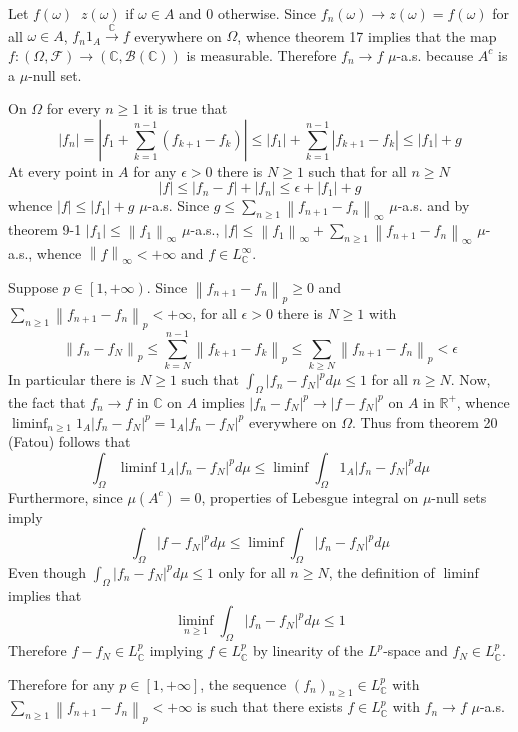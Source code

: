 \documentclass[a4paper]{article}
\newcommand{\clo}[1]{\left [ #1 \right ]}
\newcommand{\clop}[1]{\left [ #1 \right )}
\newcommand{\brac}[1]{\left ( #1 \right )}
\newcommand{\abs}[1]{\left | #1 \right |}
\newcommand{\nrm}[1]{\left\| #1 \right \|}
\newcommand{\Real}{\mathbb{R}}
\newcommand{\Cplx}{\mathbb{C}}
\newcommand{\Fcal}{\mathcal{F}}
\newcommand{\borel}[1]{\mathcal{B}\brac{#1}}
\newcommand{\defn}{\mathop{\overset{\Delta}{=}}\nolimits}
\begin{document}
Let $f\brac{\omega}\defn z\brac{\omega}$ if $\omega\in A$ and $0$ otherwise. Since $f_n\brac{\omega}\to z\brac{\omega} = f\brac{\omega}$ for all $\omega\in A$, $f_n 1_A \overset{\Cplx}{\to} f$ everywhere on $\Omega$, whence theorem 17 implies that the map $f:\brac{\Omega, \Fcal}\to\brac{\Cplx, \borel{\Cplx}}$ is measurable. Therefore $f_n\to f$ $\mu$-a.s. because $A^c$ is a $\mu$-null set.

On $\Omega$ for every $n\geq 1$ it is true that \[\abs{f_n} = \abs{f_1+\sum_{k=1}^{n-1}\brac{f_{k+1}-f_k}}\leq \abs{f_1} + \sum_{k=1}^{n-1} \abs{f_{k+1}-f_k} \leq \abs{f_1} + g\] At every point in $A$ for any $\epsilon>0$ there is $N\geq 1$ such that for all $n\geq N$ \[\abs{f} \leq \abs{f_n-f}+\abs{f_n} \leq \epsilon + \abs{f_1} + g\] whence $\abs{f}\leq \abs{f_1} + g$ $\mu$-a.s. Since $g\leq \sum_{n\geq 1} \nrm{f_{n+1}-f_n}_\infty$ $\mu$-a.s. and by theorem 9-1 $\abs{f_1}\leq \nrm{f_1}_\infty$ $\mu$-a.s., $\abs{f}\leq \nrm{f_1}_\infty + \sum_{n\geq 1} \nrm{f_{n+1}-f_n}_\infty$ $\mu$-a.s., whence $\nrm{f}_\infty < +\infty$ and $f\in L^\infty_\Cplx$.

Suppose $p\in \clop{1, +\infty}$. Since $\nrm{f_{n+1}-f_n}_p\geq 0$ and $\sum_{n\geq 1} \nrm{f_{n+1}-f_n}_p < +\infty$, for all $\epsilon>0$ there is $N\geq 1$ with \[\nrm{f_n - f_N}_p \leq \sum_{k=N}^{n-1} \nrm{f_{k+1}-f_k}_p\leq \sum_{k\geq N} \nrm{f_{n+1}-f_n}_p < \epsilon\] In particular there is $N\geq 1$ such that $\int_\Omega \abs{ f_n - f_N}^p d\mu \leq 1$ for all $n\geq N$. Now, the fact that $f_n\to f$ in $\Cplx$ on $A$ implies $\abs{f_n-f_N}^p \to \abs{f-f_N}^p$ on $A$ in $\Real^+$, whence $\liminf_{n\geq 1} 1_A\abs{f_n-f_N}^p = 1_A\abs{f_n-f_N}^p$ everywhere on $\Omega$. Thus from theorem 20 (Fatou) follows that \[\int_\Omega \liminf 1_A \abs{f_n-f_N}^p d\mu \leq \liminf \int_\Omega 1_A \abs{f_n-f_N}^p d\mu\] Furthermore, since $\mu\brac{A^c}=0$, properties of Lebesgue integral on $\mu$-null sets imply \[\int_\Omega \abs{f-f_N}^p d\mu \leq \liminf \int_\Omega \abs{f_n-f_N}^p d\mu\] Even though $\int_\Omega \abs{f_n-f_N}^p d\mu \leq 1$ only for all $n\geq N$, the definition of $\liminf$ implies that \[\liminf_{n\geq 1} \int_\Omega \abs{f_n-f_N}^p d\mu\leq 1\] Therefore $f-f_N \in L^p_\Cplx$ implying $f\in L^p_\Cplx$ by linearity of the $L^p$-space and $f_N\in L^p_\Cplx$.

Therefore for any $p\in \clo{1,+\infty}$, the sequence $\brac{f_n}_{n\geq 1}\in L^p_\Cplx$ with $\sum_{n\geq 1} \nrm{f_{n+1}-f_n}_p<+\infty$ is such that there exists $f\in L^p_\Cplx$ with $f_n\to f$ $\mu$-a.s.
\end{document}
